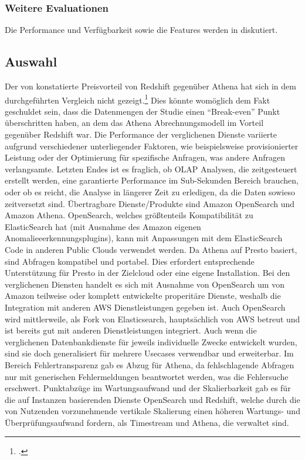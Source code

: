 \subsubsection{Weitere Evaluationen}
Die Performance und Verfügbarkeit sowie die Features werden in  diskutiert.


\subsection{Auswahl}
Der von \citeauthor{Tan.2019} konstatierte Preisvorteil von Redshift gegenüber Athena hat sich in dem durchgeführten Vergleich nicht gezeigt.\footcite[Vgl.][2178\psq]{Tan.2019} Dies könnte womöglich dem Fakt geschuldet sein, dass die Datenmengen der Studie einen \enquote{Break-even} Punkt überschritten haben, an dem das Athena Abrechnungsmodell im Vorteil gegenüber Redshift war.
Die Performance der verglichenen Dienste variierte aufgrund verschiedener unterliegender Faktoren, wie beispielsweise provisionierter Leistung oder der Optimierung für spezifische Anfragen, was andere Anfragen verlangsamte. Letzten Endes ist es fraglich, ob \ac{OLAP} Analysen, die zeitgesteuert erstellt werden, eine garantierte Performance im Sub-Sekunden Bereich brauchen, oder ob es reicht, die Analyse in längerer Zeit zu erledigen, da die Daten sowieso zeitversetzt sind.
Übertragbare Dienste/Produkte sind Amazon OpenSearch und Amazon Athena. OpenSearch, welches größtenteils Kompatibilität zu ElasticSearch hat (mit Ausnahme des Amazon eigenen Anomalieeerkennungsplugins), kann mit Anpassungen mit dem ElasticSearch Code in anderen Public Clouds verwendet werden. Da Athena auf Presto basiert, sind Abfragen kompatibel und portabel. Dies erfordert entsprechende Unterstützung für Presto in der Zielcloud oder eine eigene Installation.
Bei den verglichenen Diensten handelt es sich mit Ausnahme von OpenSearch um von Amazon teilweise oder komplett entwickelte properitäre Dienste, weshalb die Integration mit anderen \ac{AWS} Dienstleistungen gegeben ist. Auch OpenSearch wird mittlerweile, als Fork von Elasticsearch, hauptsächlich von \ac{AWS} betreut und ist bereits gut mit anderen Dienstleistungen integriert.
Auch wenn die verglichenen Datenbankdienste für jeweils individuelle Zwecke entwickelt wurden, sind sie doch generalisiert für mehrere Usecases verwendbar und erweiterbar.
Im Bereich Fehlertransparenz gab es Abzug für Athena, da fehlschlagende Abfragen nur mit generischen Fehlermeldungen beantwortet werden, was die Fehlersuche erschwert.
Punktabzüge im Wartungsaufwand und der Skalierbarkeit gab es für die auf Instanzen basierenden Dienste OpenSearch und Redshift, welche durch die von Nutzenden vorzunehmende vertikale Skalierung einen höheren Wartungs- und Überprüfungsaufwand fordern, als Timestream und Athena, die verwaltet sind.
